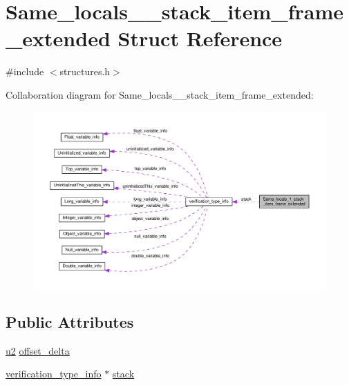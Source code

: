 \hypertarget{structSame__locals__1__stack__item__frame__extended}{}\section{Same\+\_\+locals\+\_\+\_\+stack\+\_\+item\+\_\+frame\+\_\+extended Struct Reference}
\label{structSame__locals__1__stack__item__frame__extended}


{\ttfamily \#include $<$structures.\+h$>$}



Collaboration diagram for Same\+\_\+locals\+\_\+\_\+stack\+\_\+item\+\_\+frame\+\_\+extended\+:
\nopagebreak
\begin{figure}[H]
\begin{center}
\leavevmode
\includegraphics[width=350pt]{structSame__locals__1__stack__item__frame__extended__coll__graph}
\end{center}
\end{figure}
\subsection*{Public Attributes}
\begin{DoxyCompactItemize}
\item 
\hyperlink{structures_8h_a55ef8d87fd202b8417704c089899c5b9}{u2} \hyperlink{structSame__locals__1__stack__item__frame__extended_af1fb0ce3ba68c6d6b49992b99a044235}{offset\+\_\+delta}
\item 
\hyperlink{structverification__type__info}{verification\+\_\+type\+\_\+info} $\ast$ \hyperlink{structSame__locals__1__stack__item__frame__extended_a7900584b7fadb413da796fbd30c1fa2b}{stack}
\end{DoxyCompactItemize}


